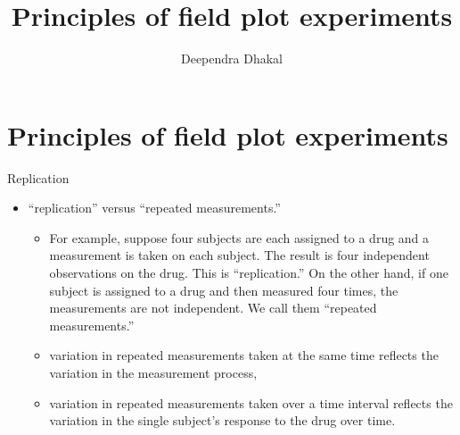 \documentclass[
  ignorenonframetext,
  aspectratio=169]{beamer}
\title{Principles of field plot experiments}
\author{Deependra Dhakal}
\date{}
\institute{Assistant Professor \and Agriculture and Forestry
University \and \url{https://rookie.rbind.io}}
\providecommand{\tightlist}{%
  \setlength{\itemsep}{0pt}\setlength{\parskip}{0pt}}
\begin{document}
\frame{\titlepage}

\begin{frame}[allowframebreaks]
  \tableofcontents[hideallsubsections]
\end{frame}
\hypertarget{principles-of-field-plot-experiments}{%
\section{Principles of field plot
experiments}\label{principles-of-field-plot-experiments}}

\begin{frame}{Replication}
\protect\hypertarget{replication}{}
\end{frame}

\begin{frame}{}
\protect\hypertarget{section}{}
\begin{itemize}
\tightlist
\item
  ``replication'' versus ``repeated measurements.''

  \begin{itemize}
  \tightlist
  \item
    For example, suppose four subjects are each assigned to a drug and a
    measurement is taken on each subject. The result is four independent
    observations on the drug. This is ``replication.'' On the other
    hand, if one subject is assigned to a drug and then measured four
    times, the measurements are not independent. We call them ``repeated
    measurements.''
  \item
    variation in repeated measurements taken at the same time reflects
    the variation in the measurement process,
  \item
    variation in repeated measurements taken over a time interval
    reflects the variation in the single subject's response to the drug
    over time.
  \end{itemize}
\end{itemize}
\end{frame}
\end{document}
